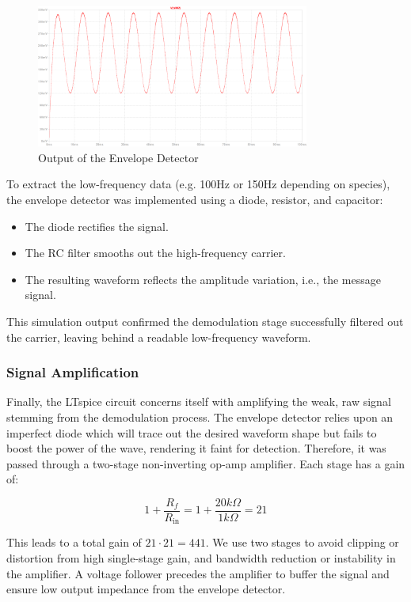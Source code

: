 \begin{figure}[H]
    \centering
    \includegraphics[width=0.8\textwidth]{subpages/images/radio_envelope_output.png}
    \caption{Output of the Envelope Detector }
    \label{fig:envelope_output}
\end{figure}

To extract the low-frequency data (e.g. 100Hz or 150Hz depending on species), the envelope detector was implemented using a diode, resistor, and capacitor:

\begin{itemize}
    \item The diode rectifies the signal.
    \item The RC filter smooths out the high-frequency carrier.
    \item The resulting waveform reflects the amplitude variation, i.e., the message signal.
\end{itemize}

This simulation output confirmed the demodulation stage successfully filtered out the carrier, leaving behind a readable low-frequency waveform.

\subsubsection{Signal Amplification}

Finally, the LTspice circuit concerns itself with amplifying the weak, raw signal stemming from the demodulation process. The envelope detector relies upon an imperfect diode which will trace out the desired waveform shape but fails to boost the power of the wave, rendering it faint for detection. Therefore, it was passed through a two-stage non-inverting op-amp amplifier. Each stage has a gain of:

\[
    1 + \frac{R_f}{R_{\text{in}}} = 1 + \frac{20k\Omega}{1k\Omega} = 21
\]

This leads to a total gain of \( 21 \cdot 21 = 441 \). We use two stages to avoid clipping or distortion from high single-stage gain, and bandwidth reduction or instability in the amplifier. A voltage follower precedes the amplifier to buffer the signal and ensure low output impedance from the envelope detector.

